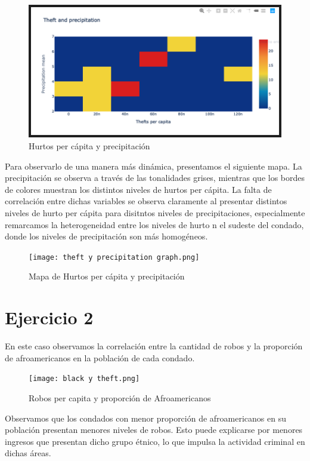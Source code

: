\documentclass[12pt, spanish]{article}
\begin{document}
\begin{figure}[hbtp]
\caption{Hurtos per cápita y precipitación}
\centering
\includegraphics[width=16cm]{grafico 1.png}
\end{figure}
\clearpage

Para observarlo de una manera más dinámica, presentamos el siguiente mapa. La precipitación se observa a través de las tonalidades grises, mientras que los bordes de colores muestran los distintos niveles de hurtos per cápita. La falta de correlación entre dichas variables se observa claramente al presentar distintos niveles de hurto per cápita para disitntos niveles de precipitaciones, especialmente remarcamos la heterogeneidad entre los niveles de hurto n el sudeste del condado, donde los niveles de precipitación son más homogéneos. 

\begin{figure}[hbtp]
\caption{Mapa de Hurtos per cápita y precipitación}
\centering
\texttt{[image: theft y precipitation graph.png]}
\end{figure}

\clearpage
\section{Ejercicio 2}

En este caso observamos la correlación entre la cantidad de robos y la proporción de afroamericanos en la población de cada condado. 

\begin{figure}[hbtp]
\caption{Robos per capita y proporción de Afroamericanos}
\centering
\texttt{[image: black y theft.png]}
\end{figure}

Observamos que los condados con menor proporción de afroamericanos en su población presentan menores niveles de robos. Esto puede explicarse por menores ingresos que presentan dicho grupo étnico, lo que impulsa la actividad criminal en dichas áreas.
\end{document}
